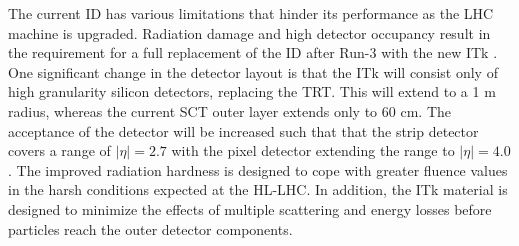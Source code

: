 The current ID has various limitations that hinder its performance as the \ac{LHC} machine is upgraded. Radiation damage and high detector occupancy result in the requirement for a full replacement of the ID after Run-3 with the new ITk \cite{pileup,itk-strip}. One significant change in the detector layout is that the ITk will consist only of high granularity silicon detectors, replacing the TRT. This will extend to a 1 m radius, whereas the current SCT outer layer extends only to 60 cm. The acceptance of the detector will be increased such that that the strip detector covers a range of $ \lvert \eta \rvert = 2.7$ with the pixel detector extending the range to $ \lvert \eta \rvert = 4.0$. The improved radiation hardness is designed to cope with greater fluence values in the harsh conditions expected at the HL-LHC. In addition, the ITk material is designed to minimize the effects of multiple scattering and energy losses before particles reach the outer detector components.






